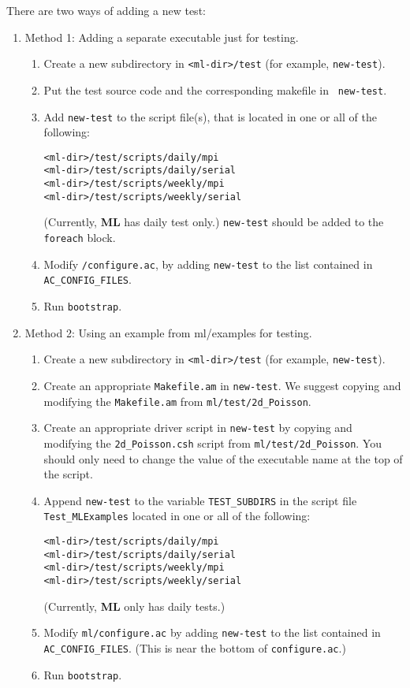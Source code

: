 \documentclass[10pt,letter,relax]{SANDreport}
\newcommand{\ML}     {{\bf ML }}
\begin{document}
There are two ways of adding a new test:
\begin{enumerate}
\item Method 1: Adding a separate executable just for testing.
\begin{enumerate}
\item Create a new subdirectory in \verb!<ml-dir>/test! (for example,
  {\tt new-test}).
\item Put the test source code and the corresponding makefile in {\tt
    new-test}.
\item Add {\tt new-test} to the script file(s), that is located in one or all
of the following:
\begin{verbatim}
<ml-dir>/test/scripts/daily/mpi
<ml-dir>/test/scripts/daily/serial
<ml-dir>/test/scripts/weekly/mpi
<ml-dir>/test/scripts/weekly/serial
\end{verbatim}
(Currently, \ML has daily test only.) {\tt new-test} should be added to
the {\tt foreach} block.
\item Modify {\tt <ml-dir>/configure.ac}, by adding {\tt new-test} to
  the list contained in {\tt AC\_CONFIG\_FILES}.
\item Run {\tt bootstrap}.
\end{enumerate}
\item Method 2: Using an example from ml/examples for testing.
\begin{enumerate}
\item Create a new subdirectory in \verb!<ml-dir>/test! (for example,
  {\tt new-test}).
\item Create an appropriate \verb!Makefile.am! in {\tt new-test}.
We suggest copying and modifying the \verb!Makefile.am! from
\verb!ml/test/2d_Poisson!.
\item Create an appropriate driver script in {\tt new-test} by
copying and modifying the \verb!2d_Poisson.csh! script from
\verb!ml/test/2d_Poisson!.
You should only need to change the value of the executable name at the top
of the script.
\item Append {\tt new-test} to the variable {\tt TEST\_SUBDIRS} in the script
 file \verb!Test_MLExamples! located in one or all of the following:
\begin{verbatim}
<ml-dir>/test/scripts/daily/mpi
<ml-dir>/test/scripts/daily/serial
<ml-dir>/test/scripts/weekly/mpi
<ml-dir>/test/scripts/weekly/serial
\end{verbatim}
(Currently, \ML only has daily tests.)
\item Modify {\tt ml/configure.ac} by adding {\tt new-test} to
  the list contained in {\tt AC\_CONFIG\_FILES}.  (This is near the bottom
  of {\tt configure.ac}.)
\item Run {\tt bootstrap}.
\end{enumerate}
\end{enumerate}
\end{document}

